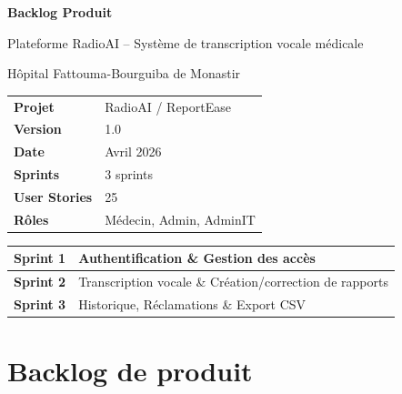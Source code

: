\documentclass[12pt,a4paper]{article}
\begin{document}
\begin{titlepage}
  \centering
  \vspace*{2cm}
  {\LARGE\bfseries Backlog Produit\par}
  \vspace{0.5cm}
  {\large Plateforme RadioAI -- Système de transcription vocale médicale\par}
  \vspace{0.3cm}
  {\normalsize Hôpital Fattouma-Bourguiba de Monastir\par}
  \vspace{1.5cm}
  \begin{tabular}{ll}
    \textbf{Projet}       & RadioAI / ReportEase \\
    \textbf{Version}      & 1.0 \\
    \textbf{Date}         & Avril 2026 \\
    \textbf{Sprints}      & 3 sprints \\
    \textbf{User Stories} & 25 \\
    \textbf{Rôles}        & Médecin, Admin, AdminIT \\
  \end{tabular}
  \vspace{1.5cm}

  \begin{tabular}{|p{3.5cm}|p{9cm}|}
    \hline
    \rowcolor{sprint1bg}
    \textcolor{sprint1txt}{\textbf{Sprint 1}} & Authentification \& Gestion des accès \\ \hline
    \rowcolor{sprint2bg}
    \textcolor{sprint2txt}{\textbf{Sprint 2}} & Transcription vocale \& Création/correction de rapports \\ \hline
    \rowcolor{sprint3bg}
    \textcolor{sprint3txt}{\textbf{Sprint 3}} & Historique, Réclamations \& Export CSV \\ \hline
  \end{tabular}
\end{titlepage}

\newpage
\tableofcontents
\newpage

\section{Backlog de produit}

\renewcommand{\arraystretch}{1.5}
\end{document}
